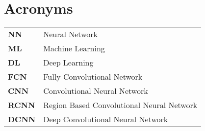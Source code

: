 \chapter*{\centering Acronyms}
\begin{spacing}{1.5}
\setlength{\parskip}{0.3in}

\begin{table}[ht]
\centering
\begin{tabular}{ll}
\textbf{NN} & Neural Network \\
\textbf{ML} & Machine Learning \\
\textbf{DL} & Deep Learning \\
\textbf{FCN} & Fully Convolutional Network \\
\textbf{CNN} & Convolutional Neural Network \\
\textbf{RCNN} & Region Based Convolutional Neural Network \\
\textbf{DCNN} & Deep Convolutional Neural Network
\end{tabular}%
\end{table}

\end{spacing}
\newpage
